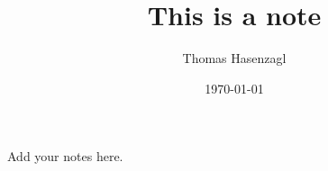 \documentclass[10 pt,a4paper]{article}
\title{This is a note}
\author{Thomas Hasenzagl}
\date{\today}
\begin{document}
\maketitle
Add your notes here. 
\end{document}
